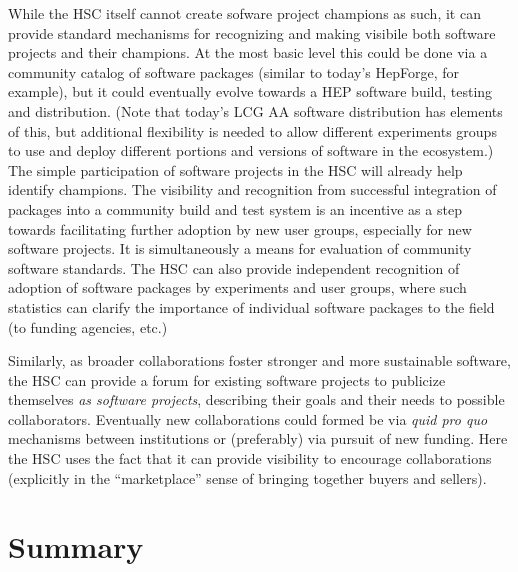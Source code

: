 \documentclass[12pt,letterpaper,fleqn]{article}
\begin{document}
While the HSC itself cannot create sofware project champions as such, 
it can provide standard mechanisms for recognizing and making
visibile both software projects and their champions.
At the most basic level this could be done via a community catalog
of software packages (similar to today's HepForge, for example), but
it could eventually evolve towards a HEP software build, testing 
and distribution. (Note that today's LCG AA software distribution has 
elements of this, but additional flexibility is needed to allow different
experiments groups to use and deploy different portions and versions of
software in the ecosystem.) The simple participation of software 
projects in the HSC will already help identify champions. The visibility 
and recognition from successful integration of packages into a community 
build and test system is an incentive as a step towards facilitating
further adoption by new user groups, especially for new software projects. 
It is simultaneously a means for evaluation of community software 
standards. The HSC can also provide independent recognition of adoption 
of software packages by experiments and user groups, where such statistics
can clarify the importance of individual software packages to the field
(to funding agencies, etc.)

Similarly, as broader collaborations foster stronger and more sustainable
software, the HSC can provide a forum for existing software projects to 
publicize themselves {\em as software projects}, describing their goals and 
their needs to possible collaborators. Eventually new collaborations could 
formed be via {\em quid pro quo} mechanisms between institutions or 
(preferably) via pursuit of new funding. Here the HSC uses the fact
that it can provide visibility to encourage collaborations (explicitly
in the ``marketplace'' sense of bringing together buyers and sellers).




\section{Summary} 
\end{document}
